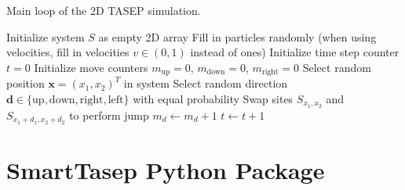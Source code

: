 \begin{algorithm}[H]
    \caption{Main loop of the 2D TASEP simulation.}
    \label{alg:2d-tasep}
    \begin{algorithmic}
        \State Initialize system $S$ as empty 2D array
        \State Fill in particles randomly (when using velocities, fill in velocities $v\in (0,1)$ instead of ones)
        \State Initialize time step counter $t=0$
        \State Initialize move counters $m_{\text{up}}=0$, $m_{\text{down}}=0$, $m_{\text{right}}=0$
            \State Select random position $\bm{x}=(x_1,x_2)^T$ in system
                \State Select random direction $\bm{d} \in \{\text{up}, \text{down}, \text{right}, \text{left}\}$ with equal probability
                    \State Swap sites $S_{x_1,x_2}$ and $S_{x_1+d_1,x_2+d_2}$ to perform jump
                    \State $m_d \gets m_d + 1$
                \EndIf
            \EndIf
            \State $t \gets t+1$
        \EndWhile
\end{algorithmic}
\end{algorithm}

  
\section{SmartTasep Python Package}
\label{sec:implementation-smarttasep}

